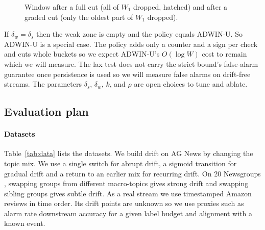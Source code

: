 \documentclass[conference]{IEEEtran}
\begin{document}
\begin{figure}[!t]
\centering
{}
\caption{Window after a full cut (all of $W_1$ dropped, hatched) and after a graded cut (only the oldest part of $W_1$ dropped).}
\label{fig:cuts}
\end{figure}

If $\delta_w=\delta_s$ then the weak zone is empty and the policy equals ADWIN-U. So ADWIN-U is a special case. The policy adds only a counter and a sign per check and cuts whole buckets so we expect ADWIN-U's $O(\log W)$ cost to remain which we will measure. The lax test does not carry the strict bound's false-alarm guarantee once persistence is used so we will measure false alarms on drift-free streams. The parameters $\delta_s$, $\delta_w$, $k$, and $\rho$ are open choices to tune and ablate.

\subsection{Evaluation plan}

\paragraph{Datasets}
Table~\ref{tab:data} lists the datasets. We build drift on AG News \cite{zhang2015} by changing the topic mix. We use a single switch for abrupt drift, a sigmoid transition for gradual drift \cite{bifet2010} and a return to an earlier mix for recurring drift. On 20 Newsgroups \cite{lang1995}, swapping groups from different macro-topics gives strong drift and swapping sibling groups gives subtle drift. As a real stream we use timestamped Amazon reviews \cite{ni2019} in time order. Its drift points are unknown so we use proxies such as alarm rate downstream accuracy for a given label budget and alignment with a known event.
\end{document}
